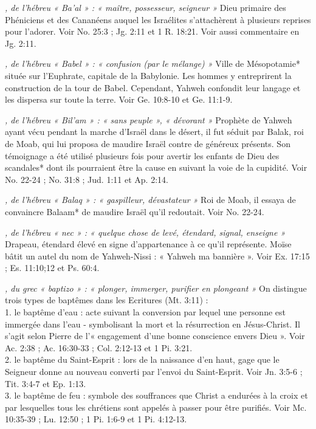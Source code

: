 \begin{multicols}{2}
\textit{, de l'hébreu « Ba'al » : « maître, possesseur, seigneur »}\newline
Dieu primaire des Phéniciens et des Cananéens auquel les Israélites s'attachèrent à plusieurs reprises pour l'adorer. Voir No. 25:3 ; Jg. 2:11 et 1 R. 18:21. Voir aussi commentaire en Jg. 2:11.

\textit{, de l'hébreu « Babel » : « confusion (par le mélange) »}\newline
Ville de Mésopotamie* située sur l'Euphrate, capitale de la Babylonie. Les hommes y entreprirent la construction de la tour de Babel. Cependant, Yahweh confondit leur langage et les dispersa sur toute la terre. Voir Ge. 10:8-10 et Ge. 11:1-9.

\textit{, de l'hébreu « Bil'am » : « sans peuple », « dévorant »}\newline
Prophète de Yahweh ayant vécu pendant la marche d'Israël dans le désert, il fut séduit par Balak, roi de Moab, qui lui proposa de maudire Israël contre de généreux présents. Son témoignage a été utilisé plusieurs fois pour avertir les enfants de Dieu des scandales* dont ils pourraient être la cause en suivant la voie de la cupidité. Voir No. 22-24 ; No. 31:8 ; Jud. 1:11 et Ap. 2:14.

\textit{, de l'hébreu « Balaq » : « gaspilleur, dévastateur »}\newline
Roi de Moab, il essaya de convaincre Balaam* de maudire Israël qu'il redoutait. Voir No. 22-24.

\textit{, de l'hébreu « nec » : « quelque chose de levé, étendard, signal, enseigne »}\newline
Drapeau, étendard élevé en signe d'appartenance à ce qu'il représente. Moïse bâtit un autel du nom de Yahweh-Nissi : « Yahweh ma bannière ». Voir Ex. 17:15 ; Es. 11:10;12 et Ps. 60:4.

\textit{, du grec « baptizo » : « plonger, immerger, purifier en plongeant »}\newline
On distingue trois types de baptêmes dans les Ecritures (Mt. 3:11) :
\\1. le baptême d'eau : acte suivant la conversion par lequel une personne est immergée dans l'eau - symbolisant la mort et la résurrection en Jésus-Christ. Il s'agit selon Pierre de l'« engagement d'une bonne conscience envers Dieu ». Voir Ac. 2:38 ; Ac. 16:30-33 ; Col. 2:12-13 et 1 Pi. 3:21.
\\2. le baptême du Saint-Esprit : lors de la naissance d'en haut, gage que le Seigneur donne au nouveau converti par l'envoi du Saint-Esprit. Voir Jn. 3:5-6 ; Tit. 3:4-7 et Ep. 1:13.
\\3. le baptême de feu : symbole des souffrances que Christ a endurées à la croix et par lesquelles tous les chrétiens sont appelés à passer pour être purifiés. Voir Mc. 10:35-39 ; Lu. 12:50 ; 1 Pi. 1:6-9 et 1 Pi. 4:12-13.


\end{multicols}
